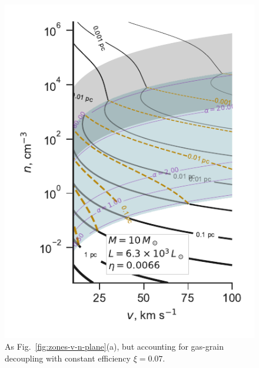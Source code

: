 \begin{figure}
  \includegraphics[width=\linewidth]{figs/decouple-v-n-plane}
  \caption{As Fig.~\ref{fig:zones-v-n-plane}(a), but accounting for
    gas-grain decoupling with constant efficiency \(\xi = 0.07\). }
  \label{fig:decouple-v-n-plane}
\end{figure}

